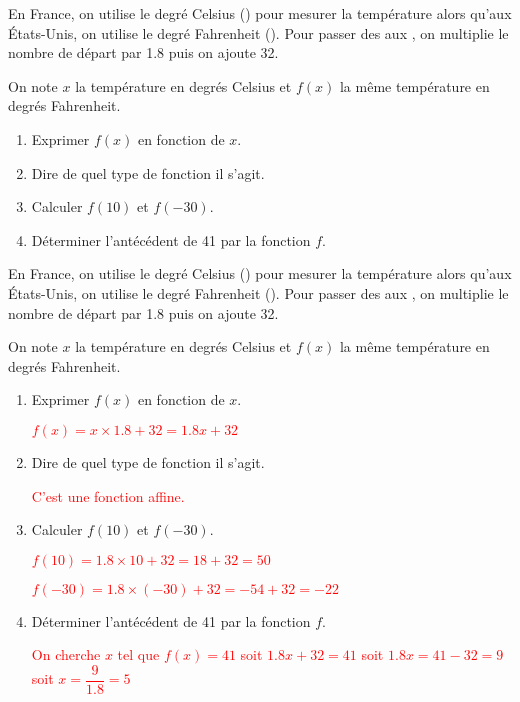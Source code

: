 \begin{exercice*}
    En France, on utilise le degré Celsius (\Temp{}) pour mesurer la température alors qu'aux États-Unis, on utilise le degré Fahrenheit (\Temp[F]{}).
    Pour passer des \Temp{} aux \Temp[F]{}, on multiplie le nombre de départ par \num{1.8} puis on ajoute \num{32}.

    On note $x$ la température en degrés Celsius et $f(x)$ la même température en degrés Fahrenheit.
    \begin{enumerate}
        \item Exprimer $f(x)$ en fonction de $x$.
        \item Dire de quel type de fonction il s'agit.
        \item Calculer $f(10)$ et $f(-30)$.
        \item Déterminer l'antécédent de 41 par la fonction $f$.
    \end{enumerate}
\end{exercice*}
\begin{corrige}
    En France, on utilise le degré Celsius (\Temp{}) pour mesurer la température alors qu'aux États-Unis, on utilise le degré Fahrenheit (\Temp[F]{}).
    Pour passer des \Temp{} aux \Temp[F]{}, on multiplie le nombre de départ par \num{1.8} puis on ajoute \num{32}.

    On note $x$ la température en degrés Celsius et $f(x)$ la même température en degrés Fahrenheit.
    \begin{enumerate}
        \item Exprimer $f(x)$ en fonction de $x$.
        
        \textcolor{red}{$f(x)=x\times\num{1.8}+32=\num{1.8}x+32$}
        \item Dire de quel type de fonction il s'agit.
        
        \textcolor{red}{C'est une fonction affine.}
        \item Calculer $f(10)$ et $f(-30)$.
        
        \textcolor{red}{$f(10)=\num{1.8}\times 10 + 32 = 18 + 32 = 50$}
        
        \textcolor{red}{$f(-30)=\num{1.8}\times (-30) + 32 = -54 + 32 = -22$}
        \item Déterminer l'antécédent de 41 par la fonction $f$.
        
        \textcolor{red}{On cherche $x$ tel que $f(x)=41$ soit $\num{1.8}x+32=41$ soit $\num{1.8}x=41-32=9$ soit $x=\dfrac{9}{\num{1.8}}=5$}
    \end{enumerate}
\end{corrige}
